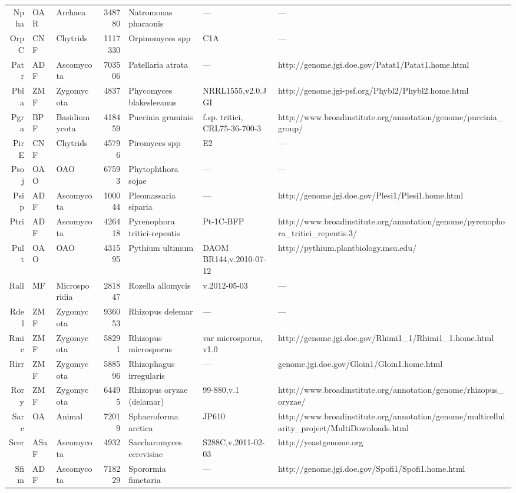 {{\begin{longtable}{rllrlll}
  Npha & OAR & Archaea & 348780 & Natromonas pharaonis & --- & --- \\ 
  OrpC & CNF & Chytrids & 1117330 & Orpinomyces spp & C1A & --- \\ 
  Patr & ADF & Ascomycota & 703506 & Patellaria atrata & --- & http://genome.jgi.doe.gov/Patat1/Patat1.home.html \\ 
  Pbla & ZMF & Zygomycota & 4837 & Phycomyces blakesleeanus & NRRL1555,v2.0.JGI & http://genome.jgi-psf.org/Phybl2/Phybl2.home.html \\ 
  Pgra & BPF & Basidiomycota & 418459 & Puccinia graminis & f.sp. tritici, CRL75-36-700-3 & http://www.broadinstitute.org/annotation/genome/puccinia\_group/ \\ 
  PirE & CNF & Chytrids & 45796 & Piromyces spp  & E2 & --- \\ 
  Psoj & OAO & OAO & 67593 & Phytophthora sojae & --- & --- \\ 
  Psip & ADF & Ascomycota & 100044 & Pleomassaria siparia & --- & http://genome.jgi.doe.gov/Plesi1/Plesi1.home.html \\ 
  Ptri & ADF & Ascomycota & 426418 & Pyrenophora tritici-repentis & Pt-1C-BFP & http://www.broadinstitute.org/annotation/genome/pyrenophora\_tritici\_repentis.3/ \\ 
  Pult & OAO & OAO & 431595 & Pythium ultimum & DAOM BR144,v.2010-07-12 & http://pythium.plantbiology.msu.edu/ \\ 
  Rall & MF & Microsporidia & 281847 & Rozella allomycis & v.2012-05-03 & --- \\ 
  Rdel & ZMF & Zygomycota & 936053 & Rhizopus delemar & --- & --- \\ 
  Rmic & ZMF & Zygomycota & 58291 & Rhizopus microsporus & var microsporus, v1.0 & http://genome.jgi.doe.gov/Rhimi1\_1/Rhimi1\_1.home.html \\ 
  Rirr & ZMF & Zygomycota & 588596 & Rhizophagus irregularis & --- & genome.jgi.doe.gov/Gloin1/Gloin1.home.html \\ 
  Rory & ZMF & Zygomycota & 64495 & Rhizopus oryzae (delamar) & 99-880,v.1 & http://www.broadinstitute.org/annotation/genome/rhizopus\_oryzae/ \\ 
  Sarc & OA & Animal & 72019 & Sphaeroforma arctica  & JP610 & http://www.broadinstitute.org/annotation/genome/multicellularity\_project/MultiDownloads.html \\ 
  Scer & ASaF & Ascomycota & 4932 & Saccharomyces cerevisiae & S288C,v.2011-02-03 & http://yeastgenome.org \\ 
  Sfim & ADF & Ascomycota & 718229 & Sporormia fimetaria & --- & http://genome.jgi.doe.gov/Spofi1/Spofi1.home.html \\ 

\end{longtable}}}
